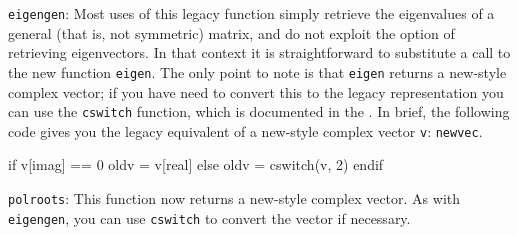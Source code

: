 \texttt{eigengen}: Most uses of this legacy function simply retrieve
the eigenvalues of a general (that is, not symmetric) matrix, and do
not exploit the option of retrieving eigenvectors. In that context it
is straightforward to substitute a call to the new function
\texttt{eigen}. The only point to note is that \texttt{eigen} returns
a new-style complex vector; if you have need to convert this to the
legacy representation you can use the \texttt{cswitch} function, which
is documented in the \GCR. In brief, the following code gives you the
legacy equivalent of a new-style complex vector \texttt{v}:
\texttt{newvec}.
\begin{code}
if v[imag] == 0
   oldv = v[real]
else
   oldv = cswitch(v, 2)
endif
\end{code}

\texttt{polroots}: This function now returns a new-style complex
vector. As with \texttt{eigengen}, you can use \texttt{cswitch} to
convert the vector if necessary.

